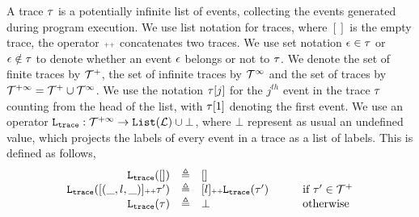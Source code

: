 A trace $\mathtt{\tau}$ is a potentially infinite list of events, 
collecting the events generated  during program execution. 
We use list notation for traces, where $[]$ is the empty trace,
the operator ${\scriptscriptstyle ++}$ concatenates two traces. We use set notation $\mathtt{\epsilon} \in \mathtt{\tau}$ or $\mathtt{\epsilon} \notin \mathtt{\tau}$ to denote whether an event $\mathtt{\epsilon}$ belongs or not to $\mathtt{\tau}$.
We denote the set of finite traces by $\mathcal{T}^{+}$, the set of infinite traces by $\mathcal{T}^{\infty}$ and the set of traces by $\mathcal{T}^{+\infty} = \mathcal{T}^{+} \cup \mathcal{T}^{\infty}$.
We use the notation $\mathtt{\tau}[j]$ for the $j^{th}$ event in the trace $\mathtt{\tau}$ counting from the head of the list, with $\mathtt{\tau}[1]$ denoting the first event.
We use an operator $\mathtt{L}_{\mathtt{{trace}}}: \mathcal{T}^{+\infty} \to \mathtt{List}(\mathcal{L})\cup \bot$, where $\bot$ represent as usual an undefined value, which projects the labels of every event in a trace as a list of labels. This is defined as follows,
\[
\begin{array}{rcll}
\mathtt{L}_{\mathtt{{trace}}}([]) &\triangleq & [] &\qquad  
\\ 
\mathtt{L}_{\mathtt{{trace}}}([(\_, l, \_)] {\scriptscriptstyle ++} \mathtt{\tau}') &\triangleq & [l] {\scriptscriptstyle ++} \mathtt{L}_{\mathtt{{trace}}}(\mathtt{\tau}') &\qquad  \mbox{if}\ \mathtt{\tau}'\in\mathcal{T}^{+}
\\
\mathtt{L}_{\mathtt{{trace}}}(\tau) &\triangleq & \bot  &\qquad  \mbox{otherwise}
\end{array}
\]
%
